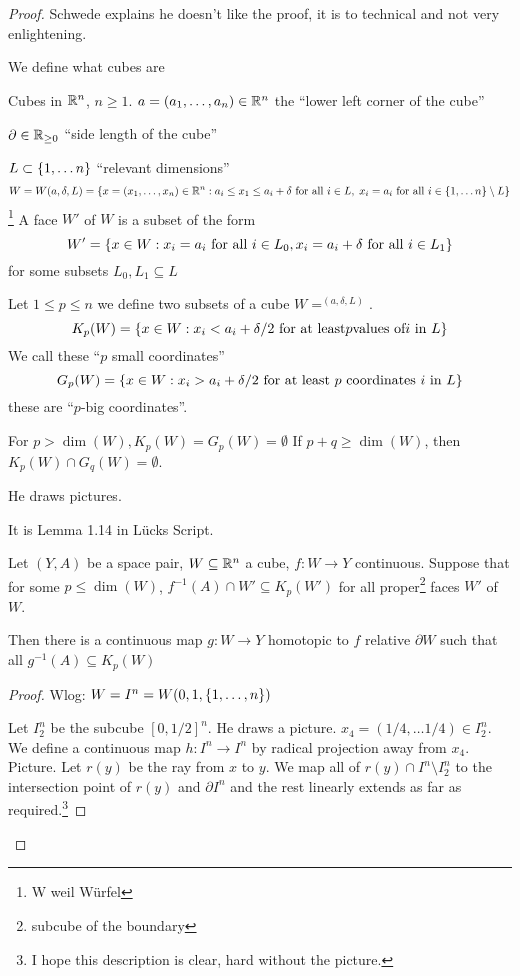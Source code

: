 \documentclass[language=english]{TemplateLecture}
\begin{document}
\begin{proof}
    Schwede explains he doesn't like the proof, it is to technical and not very enlightening.

    We define what cubes are

    Cubes in \(\mathbb{R}^n\), \(n \geq 1\).
    \(a = (a_1, \dots, a_n) \in \mathbb{R}^n\) the \enquote{lower left corner of the cube}

    \(\partial \in \mathbb{R}_{\geq 0}\) \enquote{side length of the cube}

    \(L \subset \{1, \dots n\}\) \enquote{relevant dimensions}
    \[W = W(a, \delta, L) = \{x = (x_1, \dots, x_n)\in \mathbb{R}^n : a_i\leq x_1\leq a_i + \delta \text{ for all } i \in L, \; x_i = a_i \text{ for all } i \in \{1, \dots n\} \setminus L\}\]\footnote{W weil Würfel}
    A face \(W'\) of \(W\) is a subset of the form
    \[W' = \{x \in W : x_i = a_i \text{ for all } i \in L_0, x_i = a_i + \delta \text{ for all } i \in L_1\}\]
    for some subsets \(L_0, L_1 \subseteq L\)

    Let \(1 \leq p \leq n\) we define two subsets of a cube \(W = ^(a, \delta, L)\).
    \[K_p(W) = \{x \in W : x_i < a_i + \delta/2 \text{ for at least} p \text{values of} i \text{ in } L\}\]
    We call these \enquote{\(p\) small coordinates}
    \[G_p(W) = \{x \in W : x_i > a_i + \delta/2 \text{ for at least } p \text{ coordinates } i \text{ in } L\}\]
    these are \enquote{\(p\)-big coordinates}.

    For \(p > \dim(W), K_p(W) = G_p(W)= \emptyset \) If \(p+ q \geq \dim(W)\), then \(K_p(W) \cap G_q(W) = \emptyset\).%

    He draws pictures.

    \begin{lem}{1.14}{1.14}
        It is Lemma 1.14 in Lücks Script.

        Let \((Y,A)\) be a space pair, \(W \subseteq \mathbb{R}^n\) a cube, \(f \colon W \to Y\) continuous. Suppose that for some \(p\leq \dim(W)\), \(f^{-1}(A) \cap W' \subseteq K_p(W')\) for all proper\footnote{subcube of the boundary} faces \(W'\) of \(W\).
        
        Then there is a continuous map \(g \colon W \to Y\) homotopic to \(f\) relative \(\partial W\) such that all \(g^{-1}(A)\subseteq K_p(W)\)
    \end{lem}
    \begin{proof}
        Wlog: \(W = I^n = W(0, 1, \{1,\dots ,n\})\)

        Let \(I_2^n\) be the subcube \([0, 1/2]^n\). He draws a picture. \(x_4 = (1/4, \dots 1/4) \in I_2^n\). We define a continuous map \(h \colon I^n \to I^n\) by radical projection away from \(x_4\). Picture. Let \(r(y)\) be the ray from \(x\) to \(y\). We map all of \(r(y) \cap I^n\setminus I^n_2\) to the intersection point of \(r(y)\) and \(\partial I^n\) and the rest linearly extends as far as required.\footnote{I hope this description is clear, hard without the picture.}


\end{proof}
\end{proof}
\end{document}

